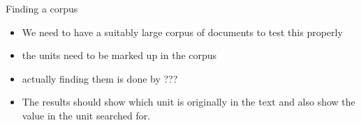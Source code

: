 \documentclass[11pt]{article}
\begin{document}
Finding a corpus
\begin{itemize}
  \item We need to have a suitably large corpus of documents to test this properly
  \item the units need to be marked up in the corpus
  \item actually finding them is done by ??? 
  \item The results should show which unit is originally in the text and also show the value in the unit searched for.
\end{itemize}


\end{document}

